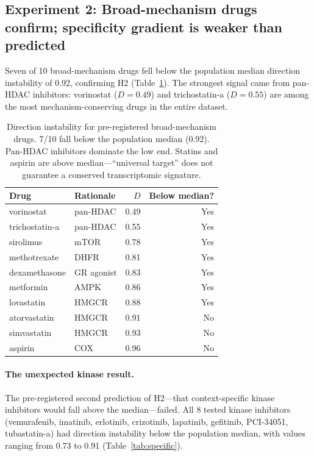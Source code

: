 \documentclass{article}
\begin{document}
\subsection{Experiment 2: Broad-mechanism drugs confirm; specificity gradient is weaker than predicted}

Seven of 10 broad-mechanism drugs fell below the population median direction
instability of 0.92, confirming H2 (Table~\ref{tab:broad}). The strongest
signal came from pan-HDAC inhibitors: vorinostat ($D = 0.49$) and
trichostatin-a ($D = 0.55$) are among the most mechanism-conserving drugs
in the entire dataset.

\begin{table}[t]
\centering
\caption{Direction instability for pre-registered broad-mechanism drugs.
7/10 fall below the population median (0.92). Pan-HDAC inhibitors dominate
the low end. Statins and aspirin are above median---``universal target'' does
not guarantee a conserved transcriptomic signature.}
\label{tab:broad}
\small
\begin{tabular}{llrr}
\toprule
Drug & Rationale & $D$ & Below median? \\
\midrule
vorinostat & pan-HDAC & 0.49 & Yes \\
trichostatin-a & pan-HDAC & 0.55 & Yes \\
sirolimus & mTOR & 0.78 & Yes \\
methotrexate & DHFR & 0.81 & Yes \\
dexamethasone & GR agonist & 0.83 & Yes \\
metformin & AMPK & 0.86 & Yes \\
lovastatin & HMGCR & 0.88 & Yes \\
atorvastatin & HMGCR & 0.91 & No \\
simvastatin & HMGCR & 0.93 & No \\
aspirin & COX & 0.96 & No \\
\bottomrule
\end{tabular}
\end{table}

\paragraph{The unexpected kinase result.}
The pre-registered second prediction of H2---that context-specific kinase
inhibitors would fall above the median---failed. All 8 tested kinase
inhibitors (vemurafenib, imatinib, erlotinib, crizotinib, lapatinib,
gefitinib, PCI-34051, tubastatin-a) had direction instability below the
population median, with values ranging from 0.73 to 0.91
(Table~\ref{tab:specific}).
\end{document}
